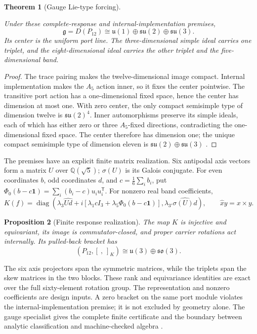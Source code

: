 \documentclass[11pt]{article}
\newtheorem{theorem}{Theorem}[section]
\newtheorem{proposition}[theorem]{Proposition}
\theoremstyle{definition}
\theoremstyle{remark}
\begin{document}
\begin{theorem}[Gauge Lie-type forcing]
\label{thm:inner-action-closure}
\leavevmode\par
Under these complete-response and internal-implementation premises,
\[
 \mathfrak g=D(P_{12})\cong
 \mathfrak u(1)\oplus\mathfrak{su}(2)\oplus\mathfrak{su}(3).
\]
Its center is the uniform port line. The three-dimensional simple ideal
carries one triplet, and the eight-dimensional ideal carries the other
triplet and the five-dimensional band.
\end{theorem}
\begin{proof}
The trace pairing makes the twelve-dimensional image compact. Internal
implementation makes the $A_5$ action inner, so it fixes the center
pointwise. The transitive port action has a one-dimensional fixed space,
hence the center has dimension at most one. With zero center, the only
compact semisimple type of dimension twelve is $\mathfrak{su}(2)^4$.
Inner automorphisms preserve its simple ideals, each of which has either
zero or three $A_5$-fixed directions, contradicting the one-dimensional
fixed space. The center therefore has dimension one; the unique compact
semisimple type of dimension eleven is
$\mathfrak{su}(2)\oplus\mathfrak{su}(3)$ \cite{hall2015}.
\end{proof}

The premises have an explicit finite matrix realization. Six antipodal
axis vectors form a matrix $U$ over $\mathbb Q(\sqrt5)$; $\sigma(U)$ is its
Galois conjugate. For even coordinates $b$, odd coordinates $d$, and
$c=\frac16\sum_i b_i$, put
$\Phi_0(b-c\mathbf1)=\sum_i(b_i-c)u_iu_i^{\mathsf T}$.
For nonzero real band coefficients,
\begin{equation}
 K(f)=\operatorname{diag}\!\left(
 \lambda_3\widehat{Ud}
 +i[\lambda_1cI_3+\lambda_5\Phi_0(b-c\mathbf1)],
 \lambda_{3'}\widehat{\sigma(U)d}\right),
 \qquad \widehat{x}y=x\times y .
\label{eq:port-response-map}
\end{equation}
\begin{proposition}[Finite response realization]
\label{thm:finite-response}
The map $K$ is injective and equivariant, its image is commutator-closed,
and proper carrier rotations act internally. Its pulled-back bracket has
\begin{equation}
 (P_{12},[\ ,\ ]_K)\cong\mathfrak u(3)\oplus\mathfrak{so}(3).
\label{eq:liealgebra}
\end{equation}
\end{proposition}
The six axis projectors span the symmetric matrices, while the triplets
span the skew matrices in the two blocks. These rank and equivariance
identities are exact over the full sixty-element rotation group. The
representation and nonzero coefficients are design inputs. A zero bracket
on the same port module violates the internal-implementation premise;
it is not excluded by geometry alone. The gauge specialist gives the
complete finite certificate and the boundary between analytic classification
and machine-checked algebra \cite{ophGauge}.
\end{document}
